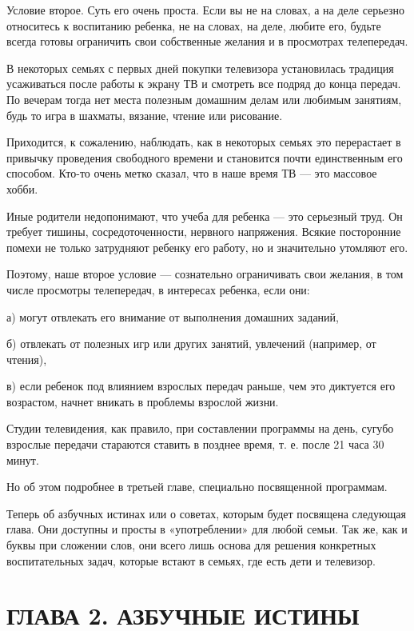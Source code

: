 \documentclass[12pt, a4paper, openany]{book}
\begin{document}
Условие второе. Суть его очень проста. Если вы не на словах, а на деле серьезно относитесь к воспитанию ребенка, не на словах, на деле, любите его, будьте всегда готовы ограничить свои собственные желания и в просмотрах телепередач. 

В некоторых семьях с первых дней покупки телевизора установилась традиция усаживаться после работы к экрану ТВ и смотреть все подряд до конца передач. По вечерам тогда нет места полезным домашним делам или любимым занятиям, будь то игра в шахматы, вязание, чтение или рисование. 

Приходится, к сожалению, наблюдать, как в некоторых семьях это перерастает в привычку проведения свободного времени и становится почти единственным его способом. Кто-то очень метко сказал, что в наше время ТВ — это массовое хобби. 

Иные родители недопонимают, что учеба для ребенка — это серьезный труд. Он требует тишины, сосредоточенности, нервного напряжения. Всякие посторонние помехи не только затрудняют ребенку его работу, но и значительно утомляют его. 

Поэтому, наше второе условие — сознательно ограничивать свои желания, в том числе просмотры телепередач, в интересах ребенка, если они: 

а) могут отвлекать его внимание от выполнения домашних заданий, 

б) отвлекать от полезных игр или других занятий, увлечений (например, от чтения), 

в) если ребенок под влиянием взрослых передач раньше, чем это диктуется его возрастом, начнет вникать в проблемы взрослой жизни. 

Студии телевидения, как правило, при составлении программы на день, сугубо взрослые передачи стараются ставить в позднее время, т. е. после 21 часа 30 минут. 

Но об этом подробнее в третьей главе, специально посвященной программам. 

Теперь об азбучных истинах или о советах, которым будет посвящена следующая глава. Они доступны и просты в «употреблении» для любой семьи. Так же, как и буквы при сложении слов, они всего лишь основа для решения конкретных воспитательных задач, которые встают в семьях, где есть дети и телевизор. 

\newpage

\section[Глава вторая. Азбучные истины]{\center \textbf{ГЛАВА 2. АЗБУЧНЫЕ ИСТИНЫ}}
\end{document}
